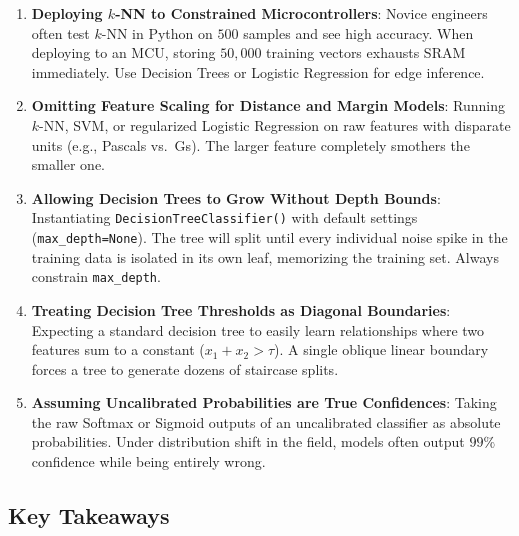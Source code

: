 \begin{warning}
\begin{enumerate}
    \item \textbf{Deploying $k$-NN to Constrained Microcontrollers}:
    Novice engineers often test $k$-NN in Python on $500$ samples and see high accuracy. When deploying to an MCU, storing $50{,}000$ training vectors exhausts SRAM immediately. Use Decision Trees or Logistic Regression for edge inference.

    \item \textbf{Omitting Feature Scaling for Distance and Margin Models}:
    Running $k$-NN, SVM, or regularized Logistic Regression on raw features with disparate units (e.g., Pascals vs.\ Gs). The larger feature completely smothers the smaller one.

    \item \textbf{Allowing Decision Trees to Grow Without Depth Bounds}:
    Instantiating \texttt{DecisionTreeClassifier()} with default settings (\texttt{max\_depth=None}). The tree will split until every individual noise spike in the training data is isolated in its own leaf, memorizing the training set. Always constrain \texttt{max\_depth}.

    \item \textbf{Treating Decision Tree Thresholds as Diagonal Boundaries}:
    Expecting a standard decision tree to easily learn relationships where two features sum to a constant ($x_1 + x_2 > \tau$). A single oblique linear boundary forces a tree to generate dozens of staircase splits.

    \item \textbf{Assuming Uncalibrated Probabilities are True Confidences}:
    Taking the raw Softmax or Sigmoid outputs of an uncalibrated classifier as absolute probabilities. Under distribution shift in the field, models often output $99\%$ confidence while being entirely wrong.
\end{enumerate}
\end{warning}

\subsection{Key Takeaways}\label{subsec:classification_takeaways}

